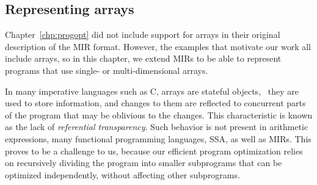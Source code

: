 

\subsection{Representing arrays}
\label{sub:extending_the_translation_to_handle_arrays}

Chapter~\ref{chp:progopt} did not include support for arrays in their original
description of the MIR format. However, the examples that motivate our work
all include arrays, so in this chapter, we extend MIRs to be able to represent
programs that use single- or multi-dimensional arrays.

In many imperative languages such as C, arrays are stateful objects, \ie~they
are used to store information, and changes to them are reflected to concurrent
parts of the program that may be oblivious to the changes.  This characteristic
is known as the lack of \emph{referential transparency}.  Such behavior is not
present in arithmetic expressions, many functional programming languages, SSA,
as well as MIRs.  This proves to be a challenge to us, because our efficient
program optimization relies on recursively dividing the program into smaller
subprograms that can be optimized independently, without affecting other
subprograms.

